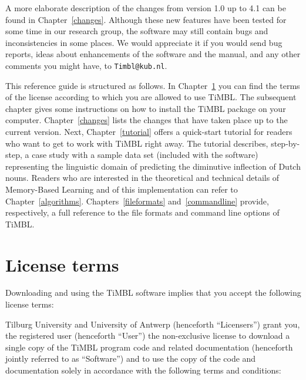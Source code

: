 \documentclass{report}
\begin{document}
A more elaborate description of the changes from version 1.0 up to 4.1
can be found in Chapter~\ref{changes}. Although these new features
have been tested for some time in our research group, the software may
still contain bugs and inconsistencies in some places. We would
appreciate it if you would send bug reports, ideas about enhancements
of the software and the manual, and any other comments you might have,
to {\tt Timbl@kub.nl}.

This reference guide is structured as follows. In
Chapter~\ref{license} you can find the terms of the license according
to which you are allowed to use TiMBL. The subsequent chapter gives
some instructions on how to install the TiMBL package on your
computer. Chapter~\ref{changes} lists the changes that have taken
place up to the current version. Next, Chapter~\ref{tutorial} offers a
quick-start tutorial for readers who want to get to work with TiMBL
right away. The tutorial describes, step-by-step, a case study with a
sample data set (included with the software) representing the
linguistic domain of predicting the diminutive inflection of Dutch
nouns.  Readers who are interested in the theoretical and technical
details of Memory-Based Learning and of this implementation can refer
to Chapter~\ref{algorithms}. Chapters~\ref{fileformats}
and~\ref{commandline} provide, respectively, a full reference to the
file formats and command line options of TiMBL.

\chapter{License terms}
\label{license}

Downloading and using the TiMBL software implies that you accept the
following license terms:

Tilburg University and University of Antwerp (henceforth
``Licensers'') grant you, the registered user (henceforth ``User'')
the non-exclusive license to download a single copy of the TiMBL
program code and related documentation (henceforth jointly referred to
as ``Software'') and to use the copy of the code and documentation
solely in accordance with the following terms and conditions:
\end{document}

